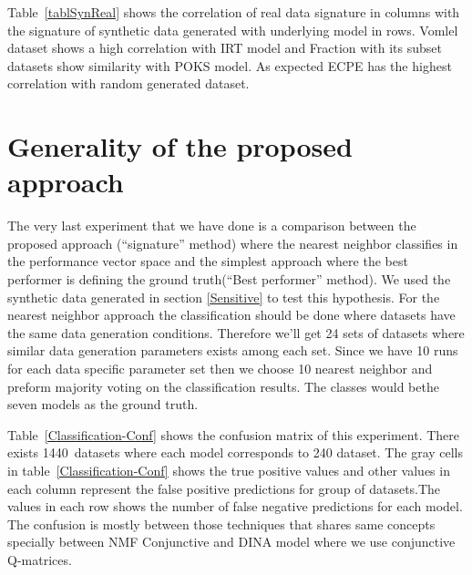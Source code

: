 Table~\ref{tablSynReal} shows the correlation of real data signature in columns with the signature of synthetic data generated with underlying model in rows. Vomlel dataset shows a high correlation with IRT model and Fraction with its subset datasets show similarity with POKS model. As expected ECPE has the highest correlation with random generated dataset.







\section{Generality of the proposed approach}

The very last experiment that we have done is a comparison between the proposed approach (``signature'' method) where the nearest neighbor classifies in the performance vector space and the simplest approach where the best performer is defining the ground truth(``Best performer'' method). We used the synthetic data generated in section \ref{Sensitive} to test this hypothesis. For the nearest neighbor approach the classification should be done where datasets have the same data generation conditions. Therefore we'll get 24 sets of datasets where similar data generation parameters exists among each set. Since we have 10 runs for each data specific parameter set then we choose 10 nearest neighbor and preform majority voting on the classification results. The classes would bethe seven models as the ground truth.

Table~\ref{Classification-Conf} shows the confusion matrix of this experiment. There exists 1440~datasets where each model corresponds to 240 dataset. The gray cells in table~\ref{Classification-Conf} shows the true positive values and other values in each column represent the false positive predictions for group of datasets.The values in each row shows the number of false negative predictions for each model. The confusion is mostly between those techniques that shares same concepts specially between NMF Conjunctive and DINA model where we use conjunctive Q-matrices. 


